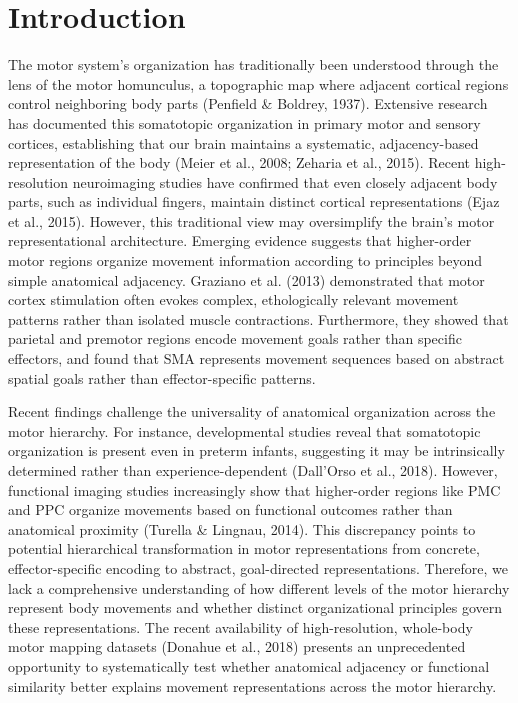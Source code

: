 \documentclass{article}
\begin{document}
\section{Introduction} 
The motor system's organization has traditionally been understood through the lens of the motor homunculus, a topographic map where adjacent cortical regions control neighboring body parts (Penfield \& Boldrey, 1937). Extensive research has documented this somatotopic organization in primary motor and sensory cortices, establishing that our brain maintains a systematic, adjacency-based representation of the body (Meier et al., 2008; Zeharia et al., 2015). Recent high-resolution neuroimaging studies have confirmed that even closely adjacent body parts, such as individual fingers, maintain distinct cortical representations (Ejaz et al., 2015). However, this traditional view may oversimplify the brain's motor representational architecture. Emerging evidence suggests that higher-order motor regions organize movement information according to principles beyond simple anatomical adjacency. Graziano et al. (2013) demonstrated that motor cortex stimulation often evokes complex, ethologically relevant movement patterns rather than isolated muscle contractions. Furthermore, they showed that parietal and premotor regions encode movement goals rather than specific effectors, and found that SMA represents movement sequences based on abstract spatial goals rather than effector-specific patterns. 

Recent findings challenge the universality of anatomical organization across the motor hierarchy. For instance, developmental studies reveal that somatotopic organization is present even in preterm infants, suggesting it may be intrinsically determined rather than experience-dependent (Dall'Orso et al., 2018). However, functional imaging studies increasingly show that higher-order regions like PMC and PPC organize movements based on functional outcomes rather than anatomical proximity (Turella \& Lingnau, 2014). This discrepancy points to potential hierarchical transformation in motor representations from concrete, effector-specific encoding to abstract, goal-directed representations. Therefore, we lack a comprehensive understanding of how different levels of the motor hierarchy represent body movements and whether distinct organizational principles govern these representations. The recent availability of high-resolution, whole-body motor mapping datasets (Donahue et al., 2018) presents an unprecedented opportunity to systematically test whether anatomical adjacency or functional similarity better explains movement representations across the motor hierarchy.
\end{document}
